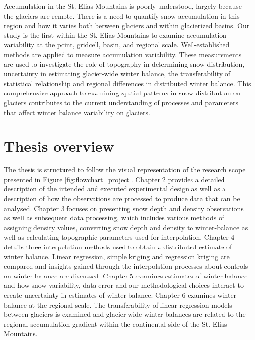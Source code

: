 \documentclass{sfuthesis}
\begin{document}
Accumulation in the St. Elias Mountains is poorly understood, largely because the glaciers are remote. There is a need to quantify snow accumulation in this region and how it varies both between glaciers and within glacierized basins. Our study is the first within the St. Elias Mountains to examine accumulation variability at the point, gridcell, basin, and regional scale. Well-established methods are applied to measure accumulation variability.  These measurements are used to investigate the role of topography in determining snow distribution, uncertainty in estimating glacier-wide winter balance, the transferability of statistical relationship and regional differences in distributed winter balance. This comprehensive approach to examining spatial patterns in snow distribution on glaciers contributes to the current understanding of processes and parameters that affect winter balance variability on glaciers. 

\section{Thesis overview}
The thesis is structured to follow the visual representation of the research scope presented in Figure \ref{fig:flowchart_project}. Chapter 2 provides a detailed description of the intended and executed experimental design as well as a description of how the observations are processed to produce data that can be analysed. Chapter 3 focuses on presenting snow depth and density observations as well as subsequent data processing, which includes various methods of assigning density values, converting snow depth and density to winter-balance as well as calculating topographic parameters used for interpolation. Chapter 4 details three interpolation methods used to obtain a distributed estimate of winter balance. Linear regression, simple kriging and regression kriging are compared and insights gained through the interpolation processes about controls on winter balance are discussed. Chapter 5 examines estimates of winter balance and how snow variability, data error and our methodological choices interact to create uncertainty in estimates of winter balance. Chapter 6 examines winter balance at the regional-scale. The transferability of linear regression models between glaciers is examined and glacier-wide winter balances are related to the regional accumulation gradient within the continental side of the St. Elias Mountains. 

\end{document}
